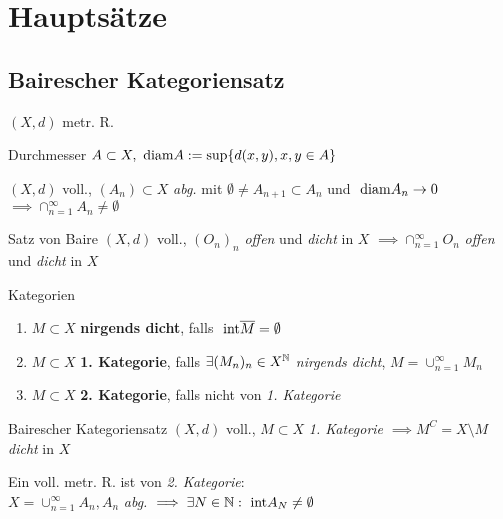\section{Hauptsätze}


\subsection{Bairescher Kategoriensatz}
  $(X,d)$ metr. R.

\begin{definition}{Durchmesser}
  $A \subset X,\text{ diam} A := \sup\{d(x,y), x,y\in A\} $
\end{definition}

\begin{lemma}
  $(X,d)$ voll., $(A_n) \subset X$ \textit{abg.} mit
  $\emptyset \neq A_{n+1} \subset A_n$ und $\text{ diam} A_n \to 0$
  $\implies \cap_{n=1}^\infty A_n \neq \emptyset$
\end{lemma}

\begin{satz}{Satz von Baire}
  $(X,d)$ voll., $(O_n)_n$ \textit{offen} und \textit{dicht} in
  \(X\)
  $\implies \cap_{n=1}^\infty O_n$ \textit{offen} und \textit{dicht} in \(X\)
\end{satz}

\begin{definition}{Kategorien}
  \begin{enumerate}[label = (\roman*)]
    \item $M \subset X$ \textbf{nirgends dicht},
      falls $\text{ int} \overline{M} = \emptyset$
    \item $M \subset X$ \textbf{1. Kategorie}, falls $\exists (M_n)_n \in X^{\mathbb{N}}$
      \textit{nirgends dicht}, $M = \cup_{n=1}^\infty M_n$
    \item $M \subset X$ \textbf{2. Kategorie}, falls nicht von
      \textit{1. Kategorie}
  \end{enumerate}
\end{definition}

\begin{satz}{Bairescher Kategoriensatz}
  $(X,d)$ voll., $M \subset X$ \textit{1. Kategorie} $\implies M^C = 
  X\setminus M$
  \textit{dicht} in $X$
\end{satz}

\begin{korrolar}
  Ein voll. metr. R. ist von \textit{2. Kategorie}:\\
  $X = \cup_{n=1}^\infty A_n, A_n$ \textit{abg.}
  $\implies \exists N \in \mathbb{N}: \text{ int} A_N \neq \emptyset$
\end{korrolar}


